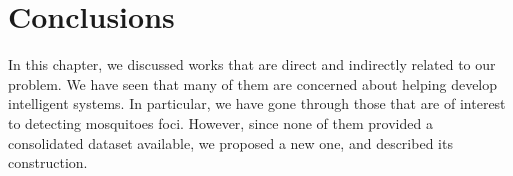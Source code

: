   \section{Conclusions}
%
In this chapter, we discussed works that are direct and indirectly related to our problem.
We have seen that many of them are concerned about helping develop intelligent systems.
In particular, we have gone through those that are of interest to detecting mosquitoes foci.
However, since none of them provided a consolidated dataset available,
we proposed a new one, and described its construction.





